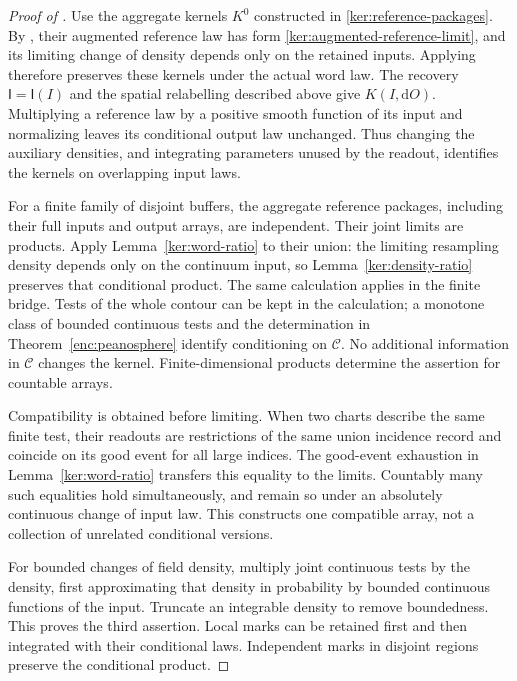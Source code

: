 \documentclass[11pt]{article}
\numberwithin{equation}{section}
\theoremstyle{definition}
\theoremstyle{remark}
\newcommand{\1}{\mathbf 1}
\begin{document}
\begin{proof}[Proof of ]
Use the aggregate kernels \(K^0\) constructed in
\eqref{ker:reference-packages}. By , their
augmented reference law has form
\eqref{ker:augmented-reference-limit}, and its limiting change of
density depends only on the retained inputs. Applying
 therefore preserves these kernels under the
actual word law. The recovery \(\mathsf I=\mathsf I(I)\) and the
spatial relabelling described above give \(K(I,\mathrm d O)\).
Multiplying a reference law by a positive smooth function of its input
and normalizing leaves its conditional output law unchanged.  Thus
changing the auxiliary densities, and integrating parameters unused
by the readout, identifies the kernels on overlapping input laws.

For a finite family of disjoint buffers, the aggregate reference
packages, including their full inputs and output arrays, are independent.
Their joint limits are products.  Apply Lemma~\ref{ker:word-ratio}
to their union: the limiting resampling density depends only on the
continuum input, so Lemma~\ref{ker:density-ratio} preserves that
conditional product.  The same calculation applies in the finite
bridge.  Tests of the whole contour can be kept in the calculation;
a monotone class of bounded continuous tests and the determination
in Theorem~\ref{enc:peanosphere} identify conditioning on
\(\mathcal C\).  No additional information in \(\mathcal C\) changes
the kernel.  Finite-dimensional products determine the assertion for
countable arrays.

Compatibility is obtained before limiting.  When two charts describe
the same finite test, their readouts are restrictions of the same
union incidence record and coincide on its good event for all large
indices.  The good-event exhaustion in Lemma~\ref{ker:word-ratio}
transfers this equality to the limits.  Countably many such equalities
hold simultaneously, and remain so under an absolutely continuous
change of input law.  This constructs one compatible array, not a
collection of unrelated conditional versions.

For bounded changes of field density, multiply joint continuous tests
by the density, first approximating that density in probability by
bounded continuous functions of the input.  Truncate an integrable
density to remove boundedness.  This proves the third assertion.
Local marks can be retained first and then integrated with their
conditional laws.  Independent marks in disjoint regions preserve
the conditional product.


\end{proof}
\end{document}
